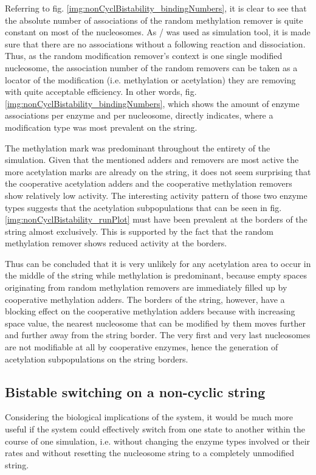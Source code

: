             Referring to fig. \ref{img:nonCyclBistability_bindingNumbers}, it is clear to see that the absolute number of associations of the random methylation remover is quite constant on most of the nucleosomes. As \ed/ was used as simulation tool, it is made sure that there are no associations without a following reaction and dissociation. Thus, as the random modification remover's context is one single modified nucleosome, the association number of the random removers can be taken as a locator of the modification (i.e. methylation or acetylation) they are removing with quite acceptable efficiency. In other words, fig. \ref{img:nonCyclBistability_bindingNumbers}, which shows the amount of enzyme associations per enzyme and per nucleosome, directly indicates, where a modification type was most prevalent on the string.

            The methylation mark was predominant throughout the entirety of the simulation. Given that the mentioned adders and removers are most active the more acetylation marks are already on the string, it does not seem surprising that the cooperative acetylation adders and the cooperative methylation removers show relatively low activity. The interesting activity pattern of those two enzyme types suggests that the acetylation subpopulations that can be seen in fig. \ref{img:nonCyclBistability_runPlot} must have been prevalent at the borders of the string almost exclusively. This is supported by the fact that the random methylation remover shows reduced activity at the borders.

            Thus can be concluded that it is very unlikely for any acetylation area to occur in the middle of the string while methylation is predominant, because empty spaces originating from random methylation removers are immediately filled up by cooperative methylation adders. The borders of the string, however, have a blocking effect on the cooperative methylation adders because with increasing space value, the nearest nucleosome that can be modified by them moves further and further away from the string border. The very first and very last nucleosomes are not modifiable at all by cooperative enzymes, hence the generation of acetylation subpopulations on the string borders.
        \subsection{Bistable switching on a non-cyclic string}
            Considering the biological implications of the system, it would be much more useful if the system could effectively switch from one state to another within the course of one simulation, i.e. without changing the enzyme types involved or their rates and without resetting the nucleosome string to a completely unmodified string.

